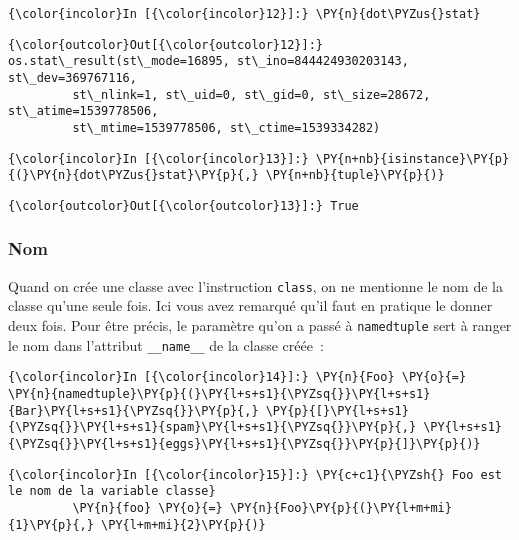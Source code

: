     \begin{Verbatim}[commandchars=\\\{\}]
{\color{incolor}In [{\color{incolor}12}]:} \PY{n}{dot\PYZus{}stat}
\end{Verbatim}


\begin{Verbatim}[commandchars=\\\{\}]
{\color{outcolor}Out[{\color{outcolor}12}]:} os.stat\_result(st\_mode=16895, st\_ino=844424930203143, st\_dev=369767116,
         st\_nlink=1, st\_uid=0, st\_gid=0, st\_size=28672, st\_atime=1539778506,
         st\_mtime=1539778506, st\_ctime=1539334282)
\end{Verbatim}
            
    \begin{Verbatim}[commandchars=\\\{\}]
{\color{incolor}In [{\color{incolor}13}]:} \PY{n+nb}{isinstance}\PY{p}{(}\PY{n}{dot\PYZus{}stat}\PY{p}{,} \PY{n+nb}{tuple}\PY{p}{)}
\end{Verbatim}


\begin{Verbatim}[commandchars=\\\{\}]
{\color{outcolor}Out[{\color{outcolor}13}]:} True
\end{Verbatim}
            
    \hypertarget{nom}{%
\subsubsection{Nom}\label{nom}}

    Quand on crée une classe avec l'instruction \texttt{class}, on ne
mentionne le nom de la classe qu'une seule fois. Ici vous avez remarqué
qu'il faut en pratique le donner deux fois. Pour être précis, le
paramètre qu'on a passé à \texttt{namedtuple} sert à ranger le nom dans
l'attribut \texttt{\_\_name\_\_} de la classe créée~:

    \begin{Verbatim}[commandchars=\\\{\}]
{\color{incolor}In [{\color{incolor}14}]:} \PY{n}{Foo} \PY{o}{=} \PY{n}{namedtuple}\PY{p}{(}\PY{l+s+s1}{\PYZsq{}}\PY{l+s+s1}{Bar}\PY{l+s+s1}{\PYZsq{}}\PY{p}{,} \PY{p}{[}\PY{l+s+s1}{\PYZsq{}}\PY{l+s+s1}{spam}\PY{l+s+s1}{\PYZsq{}}\PY{p}{,} \PY{l+s+s1}{\PYZsq{}}\PY{l+s+s1}{eggs}\PY{l+s+s1}{\PYZsq{}}\PY{p}{]}\PY{p}{)}
\end{Verbatim}


    \begin{Verbatim}[commandchars=\\\{\}]
{\color{incolor}In [{\color{incolor}15}]:} \PY{c+c1}{\PYZsh{} Foo est le nom de la variable classe}
         \PY{n}{foo} \PY{o}{=} \PY{n}{Foo}\PY{p}{(}\PY{l+m+mi}{1}\PY{p}{,} \PY{l+m+mi}{2}\PY{p}{)}
\end{Verbatim}



